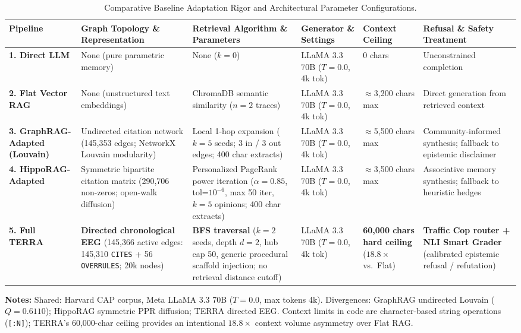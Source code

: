 \par\begingroup



\begingroup
\renewcommand{\arraystretch}{0.85}
\begin{longtable}{p{2.6cm}p{3.8cm}p{3.8cm}p{3.2cm}p{2.6cm}p{3.6cm}}
\caption{Comparative Baseline Adaptation Rigor and Architectural Parameter Configurations.}\label{tab:baseline_specifications}\\
\toprule
\textbf{Pipeline} & \textbf{Graph Topology \& Representation} & \textbf{Retrieval Algorithm \& Parameters} & \textbf{Generator \& Settings} & \textbf{Context Ceiling} & \textbf{Refusal \& Safety Treatment} \\
\midrule
\textbf{1. Direct LLM} & None (pure parametric memory) & None ($k=0$) & LLaMA 3.3 70B ($T=0.0$, 4k tok) & 0 chars & Unconstrained completion \\
\textbf{2. Flat Vector RAG} & None (unstructured text embeddings) & ChromaDB semantic similarity ($n=2$ traces) & LLaMA 3.3 70B ($T=0.0$, 4k tok) & $\approx$3,200 chars max & Direct generation from retrieved context \\
\textbf{3. GraphRAG-Adapted (Louvain)} & Undirected citation network (145,353 edges; NetworkX Louvain modularity) & Local 1-hop expansion ($k=5$ seeds; 3 in / 3 out edges; 400 char extracts) & LLaMA 3.3 70B ($T=0.0$, 4k tok) & $\approx$5,500 chars max & Community-informed synthesis; fallback to epistemic disclaimer \\
\textbf{4. HippoRAG-Adapted} & Symmetric bipartite citation matrix (290,706 non-zeros; open-walk diffusion) & Personalized PageRank power iteration ($\alpha=0.85$, tol=$10^{-6}$, max 50 iter, $k=5$ opinions; 400 char extracts) & LLaMA 3.3 70B ($T=0.0$, 4k tok) & $\approx$3,500 chars max & Associative memory synthesis; fallback to heuristic hedges \\
\midrule
\textbf{5. Full TERRA} & \textbf{Directed chronological EEG} (145,366 active edges: 145,310 \texttt{CITES} + 56 \texttt{OVERRULES}; 20k nodes) & \textbf{BFS traversal} ($k=2$ seeds, depth $d=2$, hub cap 50, generic procedural scaffold injection; no retrieval distance cutoff) & LLaMA 3.3 70B ($T=0.0$, 4k tok) & \textbf{60,000 chars hard ceiling} ($18.8\times$ vs.\ Flat) & \textbf{Traffic Cop router + NLI Smart Grader} (calibrated epistemic refusal / refutation) \\
\bottomrule
\end{longtable}
\endgroup
\vspace{0.5mm}
\raggedright \footnotesize \textbf{Notes:} Shared: Harvard CAP corpus, Meta LLaMA 3.3 70B ($T=0.0$, max tokens 4k). Divergences: GraphRAG undirected Louvain ($Q=0.6110$); HippoRAG symmetric PPR diffusion; TERRA directed EEG. Context limits in code are character-based string operations (\texttt{[:N]}); TERRA's 60,000-char ceiling provides an intentional $18.8\times$ context volume asymmetry over Flat RAG.
\par\endgroup
